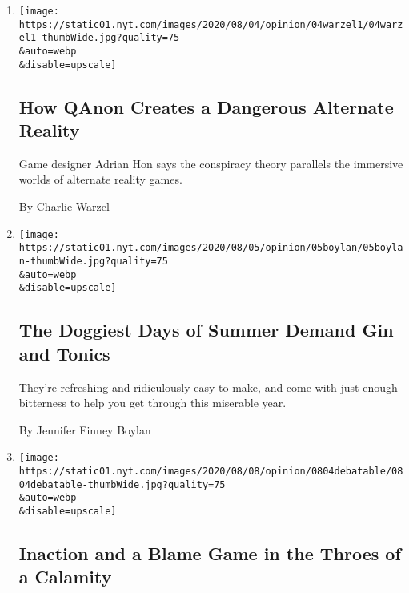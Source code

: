 \begin{enumerate}
\def\labelenumi{\arabic{enumi}.}
\item
  \href{/2020/08/04/opinion/qanon-conspiracy-theory-arg.html}{}

  \texttt{[image: https://static01.nyt.com/images/2020/08/04/opinion/04warzel1/04warzel1-thumbWide.jpg?quality=75\\\&auto=webp\\\&disable=upscale]}

  \hypertarget{how-qanon-creates-a-dangerous-alternate-reality}{%
  \subsection{How QAnon Creates a Dangerous Alternate
  Reality}\label{how-qanon-creates-a-dangerous-alternate-reality}}

  Game designer Adrian Hon says the conspiracy theory parallels the
  immersive worlds of alternate reality games.

  By Charlie Warzel
\item
  \href{/2020/08/04/opinion/gin-tonic-summer-drink.html}{}

  \texttt{[image: https://static01.nyt.com/images/2020/08/05/opinion/05boylan/05boylan-thumbWide.jpg?quality=75\\\&auto=webp\\\&disable=upscale]}

  \hypertarget{the-doggiest-days-of-summer-demand-gin-and-tonics}{%
  \subsection{The Doggiest Days of Summer Demand Gin and
  Tonics}\label{the-doggiest-days-of-summer-demand-gin-and-tonics}}

  They're refreshing and ridiculously easy to make, and come with just
  enough bitterness to help you get through this miserable year.

  By Jennifer Finney Boylan
\item
  \href{/2020/08/04/opinion/coronavirus-federal-relief-inaction-debatable.html}{}

  \texttt{[image: https://static01.nyt.com/images/2020/08/08/opinion/0804debatable/0804debatable-thumbWide.jpg?quality=75\\\&auto=webp\\\&disable=upscale]}

  \hypertarget{inaction-and-a-blame-game-in-the-throes-of-a-calamity}{%
  \subsection{Inaction and a Blame Game in the Throes of a
  Calamity}\label{inaction-and-a-blame-game-in-the-throes-of-a-calamity}}


\end{enumerate}
